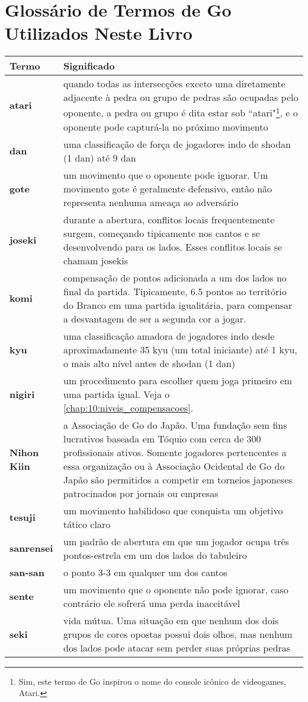 \chapter[Glossário de Termos de Go]{Glossário de Termos de Go Utilizados Neste Livro}

\begin{longtable}{l|p{85mm}} 
 \hline
 \textbf{Termo} & \textbf{Significado} \\
 \hline \hline
 \textbf{atari} & quando todas as intersecções exceto uma diretamente adjacente à pedra ou grupo de pedras são ocupadas pelo oponente, a pedra ou grupo é dita estar sob ``atari"\footnote{Sim, este termo de Go inspirou o nome do console icônico de videogames, Atari.}, e o oponente pode capturá-la no próximo movimento \\ 
 \hline
 \textbf{dan} & uma classificação de força de jogadores indo de shodan (1 dan) até 9 dan \\
 \hline
 \textbf{gote} & um movimento que o oponente pode ignorar. Um movimento gote é geralmente defensivo, então não representa nenhuma ameaça ao adversário \\
 \hline
 \textbf{joseki} & durante a abertura, conflitos locais frequentemente surgem, começando tipicamente nos cantos e se desenvolvendo para os lados. Esses conflitos locais se chamam josekis \\
 \hline
 \textbf{komi} & compensação de pontos adicionada a um dos lados no final da partida. Tipicamente, 6.5 pontos ao território do Branco em uma partida igualitária, para compensar a desvantagem de ser a segunda cor a jogar. \\
 \hline
 \textbf{kyu} & uma classificação amadora de jogadores indo desde aproximadamente 35 kyu (um total iniciante) até 1 kyu, o mais alto nível antes de shodan (1 dan) \\
 \hline
 \textbf{nigiri} & um procedimento para escolher quem joga primeiro em uma partida igual. Veja o \autoref{chap:10:niveis_compensacoes}. \\
 \hline
 \textbf{Nihon Kiin} & a Associação de Go do Japão. Uma fundação sem fins lucrativos baseada em Tóquio com cerca de 300 profissionais ativos. Somente jogadores pertencentes a essa organização ou à Associação Ocidental de Go do Japão são permitidos a competir em torneios japoneses patrocinados por jornais ou empresas \\
 \hline
 \textbf{tesuji} & um movimento habilidoso que conquista um objetivo tático claro \\
 \hline
 \textbf{sanrensei} & um padrão de abertura em que um jogador ocupa três pontos-estrela em um dos lados do tabuleiro \\
 \hline
 \textbf{san-san} & o ponto 3-3 em qualquer um dos cantos \\
 \hline
 \textbf{sente} & um movimento que o oponente não pode ignorar, caso contrário ele sofrerá uma perda inaceitável \\
 \hline
 \textbf{seki} & vida mútua. Uma situação em que nenhum dos dois grupos de cores opostas possui dois olhos, mas nenhum dos lados pode atacar sem perder suas próprias pedras \\
 \hline
\end{longtable}